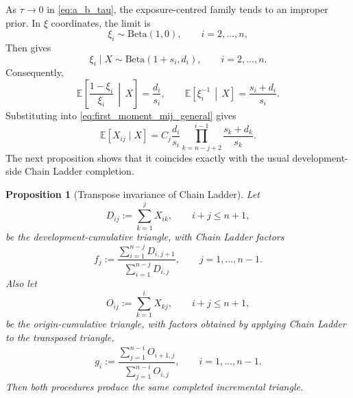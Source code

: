 \documentclass[11pt]{article}
\newtheorem{proposition}[theorem]{Proposition}
\newcommand{\E}{\mathbb{E}}
\newcommand{\1}{\mathbf{1}}
\newcommand{\BetaD}{\mathrm{Beta}}
\begin{document}
As $\tau\rightarrow 0$ in \eqref{eq:a_b_tau}, the exposure-centred family tends to an improper prior. In $\xi$ coordinates, the limit is
\begin{equation}
\xi_i \sim \BetaD(1,0),
\qquad i=2,\dots,n,
\label{eq:xi_prior_cl}
\end{equation}
Then  gives
\begin{equation}
\xi_i\mid X \sim \BetaD(1+s_i,d_i),
\qquad i=2,\dots,n.
\label{eq:xi_post_tau0}
\end{equation}
Consequently,
\begin{equation}
\E\!\left[\frac{1-\xi_i}{\xi_i}\,\middle|\,X\right]=\frac{d_i}{s_i},
\qquad
\E\!\left[\xi_i^{-1}\,\middle|\,X\right]=\frac{s_i+d_i}{s_i}.
\label{eq:inverse_moments_tau0}
\end{equation}
Substituting into \eqref{eq:first_moment_mij_general} gives
\begin{equation}
\E[X_{ij}\mid X]
=
C_j\frac{d_i}{s_i}
\prod_{k=n-j+2}^{i-1}\frac{s_k+d_k}{s_k}.
\label{eq:cell_mean_tau0}
\end{equation}
The next proposition shows that it coincides exactly with the usual development-side Chain Ladder completion.

\begin{proposition}[Transpose invariance of Chain Ladder]\label{prop:transpose_invariance}
Let
\begin{equation}
D_{ij}:=\sum_{k=1}^{j}X_{ik},
\qquad i+j\le n+1,
\label{eq:Dij_def}
\end{equation}
be the development-cumulative triangle, with Chain Ladder factors
\begin{equation}
f_j:=
\frac{\sum_{i=1}^{n-j}D_{i,j+1}}
{\sum_{i=1}^{n-j}D_{i,j}},
\qquad j=1,\dots,n-1.
\label{eq:fj_def}
\end{equation}
Also let
\begin{equation}
O_{ij}:=\sum_{k=1}^{i}X_{kj},
\qquad i+j\le n+1,
\label{eq:Oij_def}
\end{equation}
be the origin-cumulative triangle, with factors obtained by applying Chain Ladder to the transposed triangle,
\begin{equation}
g_i:=
\frac{\sum_{j=1}^{n-i}O_{i+1,j}}
{\sum_{j=1}^{n-i}O_{i,j}},
\qquad i=1,\dots,n-1.
\label{eq:gi_def}
\end{equation}
Then both procedures produce the same completed incremental triangle.
\end{proposition}
\end{document}
